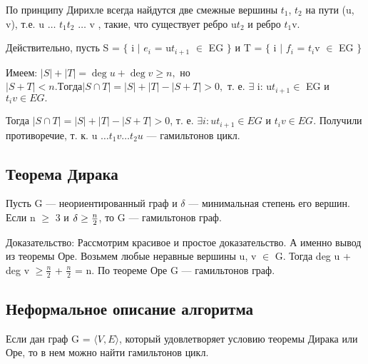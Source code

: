 По принципу Дирихле всегда найдутся две смежные вершины $t_1$, $t_2$ на пути (u, v),
т.е. u $\dots$ $t_1$$t_2$ $\dots$ v , такие, что существует ребро u$t_2$ и ребро $t_1$v.

Действительно, пусть S =  $\{$ i $\mid$ $e_i$ = u$t_{i+1}$ $\in$ EG $\}$
и T = $\{$ i $\mid$ $f_i$ = $t_i$v $\in$ EG $\}$

Имеем: $\left\vert S \right\vert + \left\vert T \right\vert = \operatorname{deg} u + \operatorname{deg} v \geqslant n,$ но $\left\vert S + T \right\vert < n.
Тогда \left\vert S\cap T \right\vert = \left\vert S \right\vert + \left\vert T \right\vert - \left\vert S+T \right\vert > 0,$
т. е. $\exists$ i: u$t_{i+1} \in$ EG и $t_iv \in EG.$

Тогда $\left\vert S \cap T \right\vert = \left\vert S \right\vert + \left\vert T \right\vert - \left\vert S + T \right\vert > 0$, т. е.
$\exists i: ut_{i+1}\in EG$ и $t_iv \in EG.$
Получили противоречие, т. к. u $\dots t_1v \dots t_2u$ — гамильтонов цикл.

\subsection{Теорема Дирака}
Пусть G — неориентированный граф и $\delta$ — минимальная степень его вершин.
Если n $\geq$ 3 и $\delta\geq{n\over{2}}$, то  G — гамильтонов граф.

{Доказательство:}
Рассмотрим красивое и простое доказательство. А именно вывод из теоремы Оре.
Возьмем любые неравные вершины u, v $\in$ G. Тогда deg u + deg v $\geqslant \frac{n}{2}$ + $\frac{n}{2}$ = n.
По теореме Оре G — гамильтонов граф.

\subsection{Неформальное описание алгоритма}
Если дан граф G = $\langle {V, E} \rangle$, который удовлетворяет условию теоремы Дирака или Оре,
то в нем можно найти гамильтонов цикл.

